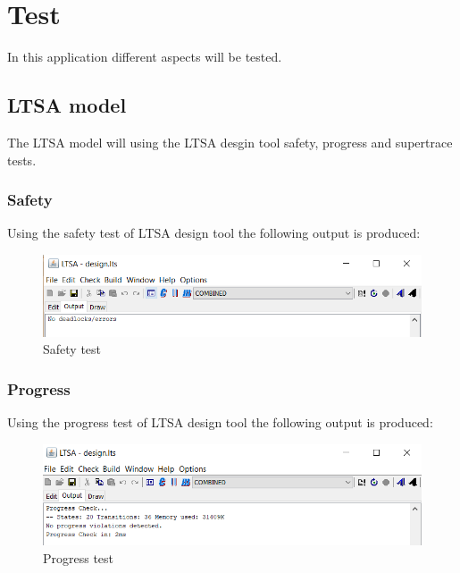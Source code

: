 \hypertarget{test}{%
\section{Test}\label{test}}

In this application different aspects will be tested.

\hypertarget{ltsa-model}{%
\subsection{LTSA model}\label{ltsa-model}}

The LTSA model will using the LTSA desgin tool safety, progress and
supertrace tests.

\hypertarget{safety}{%
\subsubsection{Safety}\label{safety}}

Using the safety test of LTSA design tool the following output is
produced:

\begin{figure}
\centering
\includegraphics{../img/safety.png}
\caption{Safety test}
\end{figure}

\hypertarget{progress}{%
\subsubsection{Progress}\label{progress}}

Using the progress test of LTSA design tool the following output is
produced:

\begin{figure}
\centering
\includegraphics{../img/progress.png}
\caption{Progress test}
\end{figure}

